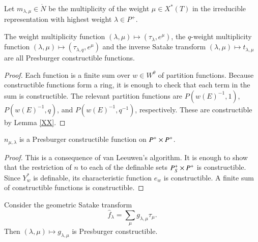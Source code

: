 


Let $m_{\lambda,\mu}\in \ring{N}$ be the multiplicity of the weight $\mu\in X^*(T)$
in the irreducible representation with highest weight $\lambda\in P^+$.


\begin{lemma}  The weight multiplicity function $(\lambda,\mu)\mapsto (\tau_\lambda,e^\mu)$, the $q$-weight multiplicity
function $(\lambda,\mu)\mapsto (\tau_{\lambda,q},e^\mu)$  and the inverse Satake transform $(\lambda,\mu)\mapsto t_{\lambda,\mu}$
are all Presburger constructible functions.
\end{lemma}

\begin{proof} 
Each function is a finite sum over $w\in W^\theta$ of partition functions.  
Because constructible functions form a ring, it is enough to check that each term in the sum is
constructible.
The relevant partition functions
are $P(w(E)^{-1},1)$, $P(w(E)^{-1},q)$, and $P(w(E)^{-1},q^{-1})$, respectively.  These are constructible
by Lemma \ref{XX}.
\end{proof}



\begin{theorem}\label{lemma:van-leeuwen} $n_{\mu,\lambda}$ is a Presburger constructible function on $P^+\times P^+$.
\end{theorem}

\begin{proof} This is a consequence of van Leeuwen's algorithm. 
It is enough to show that the restriction of $n$ to each of the definable sets
$P^+_S\times P^+$ is constructible.  
Since $Y^*_w$ is definable, its characteristic function $e_w$ is constructible.
A finite sum of constructible functions is constructible.
\end{proof}


\begin{corollary} Consider the geometric Satake transform
\[
\hat f_\lambda = \sum_\mu g_{\lambda,\mu} \tau_\mu.
\]
Then $(\lambda,\mu)\mapsto g_{\lambda,\mu}$ is Presburger constructible.
\end{corollary}

